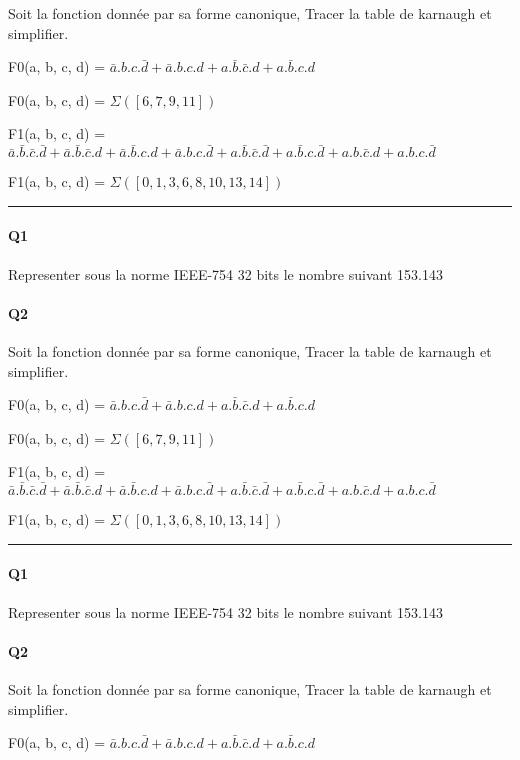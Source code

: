 Soit la fonction donnée par sa forme canonique, Tracer la table de karnaugh et simplifier.

F0(a, b, c, d) = $\bar a.b.c.\bar d + \bar a.b.c.d + a.\bar b.\bar c.d + a.\bar b.c.d$

F0(a, b, c, d) = $\varSigma([6, 7, 9, 11])$

F1(a, b, c, d) = $\bar a.\bar b.\bar c.\bar d + \bar a.\bar b.\bar c.d + \bar a.\bar b.c.d + \bar a.b.c.\bar d + a.\bar b.\bar c.\bar d + a.\bar b.c.\bar d + a.b.\bar c.d + a.b.c.\bar d$

F1(a, b, c, d) = $\varSigma([0, 1, 3, 6, 8, 10, 13, 14])$


\hrule width 1\linewidth
\paragraph{Q1}

Representer sous la norme IEEE-754 32 bits le nombre suivant
153.143
\paragraph{Q2}

Soit la fonction donnée par sa forme canonique, Tracer la table de karnaugh et simplifier.

F0(a, b, c, d) = $\bar a.b.c.\bar d + \bar a.b.c.d + a.\bar b.\bar c.d + a.\bar b.c.d$

F0(a, b, c, d) = $\varSigma([6, 7, 9, 11])$

F1(a, b, c, d) = $\bar a.\bar b.\bar c.\bar d + \bar a.\bar b.\bar c.d + \bar a.\bar b.c.d + \bar a.b.c.\bar d + a.\bar b.\bar c.\bar d + a.\bar b.c.\bar d + a.b.\bar c.d + a.b.c.\bar d$

F1(a, b, c, d) = $\varSigma([0, 1, 3, 6, 8, 10, 13, 14])$


\hrule width 1\linewidth
\paragraph{Q1}

Representer sous la norme IEEE-754 32 bits le nombre suivant
153.143
\paragraph{Q2}

Soit la fonction donnée par sa forme canonique, Tracer la table de karnaugh et simplifier.

F0(a, b, c, d) = $\bar a.b.c.\bar d + \bar a.b.c.d + a.\bar b.\bar c.d + a.\bar b.c.d$

